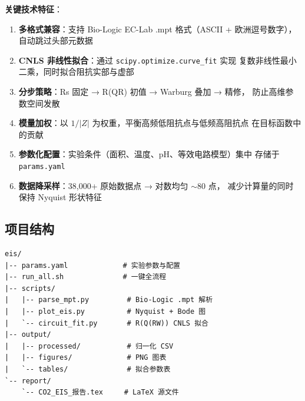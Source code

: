 \documentclass[12pt,a4paper]{ctexart}
\begin{document}
\vspace{0.5cm}

\textbf{关键技术特征}：

\begin{enumerate}[leftmargin=1.5cm]
  \item \textbf{多格式兼容}：支持 Bio-Logic EC-Lab .mpt 格式（ASCII + 欧洲逗号数字），
  自动跳过头部元数据
  \item \textbf{CNLS 非线性拟合}：通过 \texttt{scipy.optimize.curve\_fit} 实现
  复数非线性最小二乘，同时拟合阻抗实部与虚部
  \item \textbf{分步策略}：Rs 固定 → R(QR) 初值 → Warburg 叠加 → 精修，
  防止高维参数空间发散
  \item \textbf{模量加权}：以 $1/|Z|$ 为权重，平衡高频低阻抗点与低频高阻抗点
  在目标函数中的贡献
  \item \textbf{参数化配置}：实验条件（面积、温度、pH、等效电路模型）集中
  存储于 \texttt{params.yaml}
  \item \textbf{数据降采样}：38,000+ 原始数据点 → 对数均匀 $\sim$80 点，
  减少计算量的同时保持 Nyquist 形状特征
\end{enumerate}

\subsection{项目结构}

\begin{verbatim}
eis/
|-- params.yaml             # 实验参数与配置
|-- run_all.sh              # 一键全流程
|-- scripts/
|   |-- parse_mpt.py         # Bio-Logic .mpt 解析
|   |-- plot_eis.py          # Nyquist + Bode 图
|   `-- circuit_fit.py       # R(Q(RW)) CNLS 拟合
|-- output/
|   |-- processed/           # 归一化 CSV
|   |-- figures/             # PNG 图表
|   `-- tables/              # 拟合参数表
`-- report/
    `-- CO2_EIS_报告.tex     # LaTeX 源文件
\end{verbatim}
\end{document}
